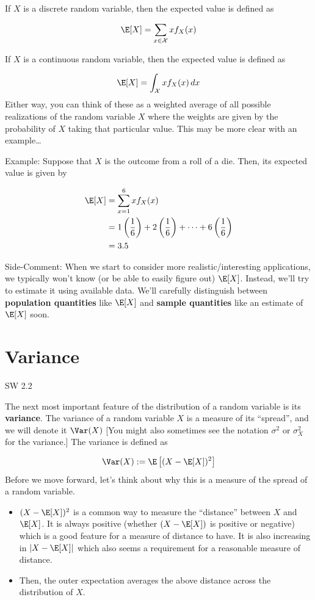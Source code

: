 \documentclass[
  letterpaper,
  DIV=11,
  numbers=noendperiod]{scrreprt}
\begin{document}
If \(X\) is a discrete random variable, then the expected value is
defined as

\[
  \E[X] = \sum_{x \in \mathcal{X}} x f_X(x)
\]

If \(X\) is a continuous random variable, then the expected value is
defined as

\[
  \E[X] = \int_{\mathcal{X}} x f_X(x) \, dx
\] Either way, you can think of these as a weighted average of all
possible realizations of the random variable \(X\) where the weights are
given by the probability of \(X\) taking that particular value. This may
be more clear with an example\ldots{}

{Example: }Suppose that \(X\) is the outcome from a roll of a die. Then,
its expected value is given by

\[
  \begin{aligned}
  \E[X] &= \sum_{x=1}^6 x f_X(x) \\
  &= 1\left(\frac{1}{6}\right) + 2\left(\frac{1}{6}\right) + \cdots + 6\left(\frac{1}{6}\right) \\
  &= 3.5
  \end{aligned}
\]

{Side-Comment:} When we start to consider more realistic/interesting
applications, we typically won't know (or be able to easily figure out)
\(\E[X]\). Instead, we'll try to estimate it using available data. We'll
carefully distinguish between \textbf{population quantities} like
\(\E[X]\) and \textbf{sample quantities} like an estimate of \(\E[X]\)
soon.

\section{Variance}\label{variance}

SW 2.2

The next most important feature of the distribution of a random variable
is its \textbf{variance}. The variance of a random variable \(X\) is a
measure of its ``spread'', and we will denote it \(\Var(X)\) {[}You
might also sometimes see the notation \(\sigma^2\) or \(\sigma_X^2\) for
the variance.{]} The variance is defined as

\[
  \Var(X) := \E\left[ (X - \E[X])^2 \right]
\] Before we move forward, let's think about why this is a measure of
the spread of a random variable.

\begin{itemize}
\item
  \((X-\E[X])^2\) is a common way to measure the ``distance'' between
  \(X\) and \(\E[X]\). It is always positive (whether \((X - \E[X])\) is
  positive or negative) which is a good feature for a measure of
  distance to have. It is also increasing in \(|X-\E[X]|\) which also
  seems a requirement for a reasonable measure of distance.
\item
  Then, the outer expectation averages the above distance across the
  distribution of \(X\).
\end{itemize}
\end{document}
